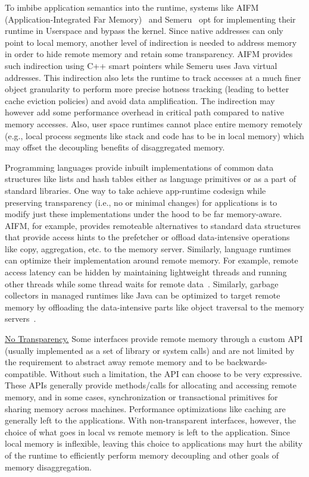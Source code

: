 To imbibe application semantics into the runtime, systems 
like AIFM (Application-Integrated Far Memory)~\cite{aifm} 
and Semeru~\cite{semeru} opt for implementing their runtime in 
Userspace and bypass the kernel. Since native addresses can 
only point to local memory, another level of indirection 
is needed to address memory in order to hide remote memory
and retain some transparency. AIFM provides such indirection 
using C++ smart pointers while Semeru 
uses Java virtual addresses. This indirection also lets 
the runtime to track accesses at a much finer object 
granularity to perform more precise hotness tracking 
(leading to better cache eviction policies) and avoid 
data amplification. The indirection may however add some 
performance overhead in critical path compared to native 
memory accesses. Also, user space runtimes cannot place entire 
memory remotely (e.g., local process segments like stack and 
code has to be in local memory) which may offset the 
decoupling benefits of disaggregated memory.

Programming languages provide inbuilt implementations of 
common data structures like lists and hash tables either as 
language primitives or as a part of standard libraries. 
One way to take achieve app-runtime codesign while preserving 
transparency (i.e., no or minimal changes) for applications 
is to modify just these implementations under the hood to be 
far memory-aware. AIFM, for example, provides remoteable 
alternatives to standard data structures that provide access 
hints to the prefetcher or offload data-intensive operations 
like copy, aggregation, etc. to the memory server. 
Similarly, language runtimes can optimize their implementation 
around remote memory. For example, remote access latency can 
be hidden by maintaining lightweight threads and running other
threads while some thread waits for remote data~\cite{aifm}.  
Similarly, garbage collectors in managed runtimes like Java
can be optimized to target remote memory by offloading the 
data-intensive parts like object traversal to the memory 
servers~\cite{semeru}.


\vspace{3pt}
\noindent \uline{No Transparency.}
Some interfaces provide remote memory through a custom API 
(usually implemented as a set of library or system calls) and  
are not limited by the requirement to abstract away remote 
memory and to be backwards-compatible. Without such a 
limitation, the API can choose to be very expressive.
These APIs generally provide methods/calls for allocating and 
accessing remote memory, and in some cases, synchronization or 
transactional primitives for sharing memory across machines. 
Performance optimizations like caching are generally left to 
the applications. With non-transparent interfaces, however,
the choice of what goes in local vs remote memory is left to 
the application. Since local memory is inflexible, leaving 
this choice to applications may hurt the ability of the 
runtime to efficiently perform memory decoupling and other 
goals of memory disaggregation.

